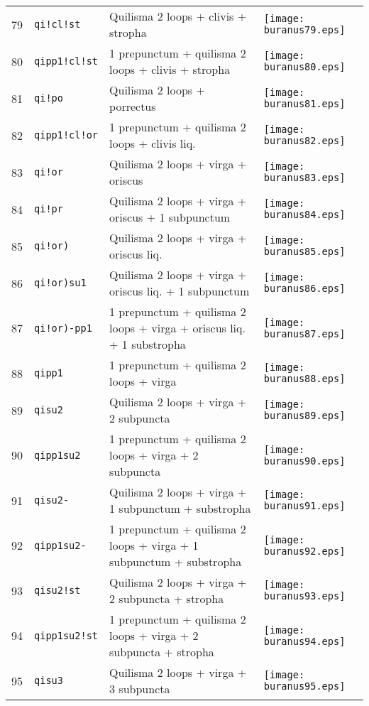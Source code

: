\documentclass{scrarticle}
\begin{document}
\begin{longtable}{l|l|l|l}
79 & \texttt{qi!cl!st} & Quilisma 2 loops + clivis + stropha & \texttt{[image: buranus79.eps]} \\
80 & \texttt{qipp1!cl!st} & 1 prepunctum + quilisma 2 loops + clivis + stropha & \texttt{[image: buranus80.eps]} \\
81 & \texttt{qi!po} & Quilisma 2 loops + porrectus & \texttt{[image: buranus81.eps]} \\
82 & \texttt{qipp1!cl!or} & 1 prepunctum + quilisma 2 loops + clivis liq. & \texttt{[image: buranus82.eps]} \\
83 & \texttt{qi!or} & Quilisma 2 loops + virga + oriscus & \texttt{[image: buranus83.eps]} \\
84 & \texttt{qi!pr} & Quilisma 2 loops + virga + oriscus + 1 subpunctum & \texttt{[image: buranus84.eps]} \\
85 & \texttt{qi!or)} & Quilisma 2 loops + virga + oriscus liq. & \texttt{[image: buranus85.eps]} \\
86 & \texttt{qi!or)su1} & Quilisma 2 loops + virga + oriscus liq. + 1 subpunctum & \texttt{[image: buranus86.eps]} \\
87 & \texttt{qi!or)-pp1} & 1 prepunctum + quilisma 2 loops + virga + oriscus liq. + 1 substropha & \texttt{[image: buranus87.eps]} \\
88 & \texttt{qipp1} & 1 prepunctum + quilisma 2 loops + virga & \texttt{[image: buranus88.eps]} \\
89 & \texttt{qisu2} & Quilisma 2 loops + virga + 2 subpuncta & \texttt{[image: buranus89.eps]} \\
90 & \texttt{qipp1su2} & 1 prepunctum + quilisma 2 loops + virga + 2 subpuncta & \texttt{[image: buranus90.eps]} \\
91 & \texttt{qisu2-} & Quilisma 2 loops + virga + 1 subpunctum + substropha & \texttt{[image: buranus91.eps]} \\
92 & \texttt{qipp1su2-} & 1 prepunctum + quilisma 2 loops + virga + 1 subpunctum + substropha & \texttt{[image: buranus92.eps]} \\
93 & \texttt{qisu2!st} & Quilisma 2 loops + virga + 2 subpuncta + stropha & \texttt{[image: buranus93.eps]} \\
94 & \texttt{qipp1su2!st} & 1 prepunctum + quilisma 2 loops + virga + 2 subpuncta + stropha & \texttt{[image: buranus94.eps]} \\
95 & \texttt{qisu3} & Quilisma 2 loops + virga + 3 subpuncta & \texttt{[image: buranus95.eps]} \\

\end{longtable}
\end{document}
